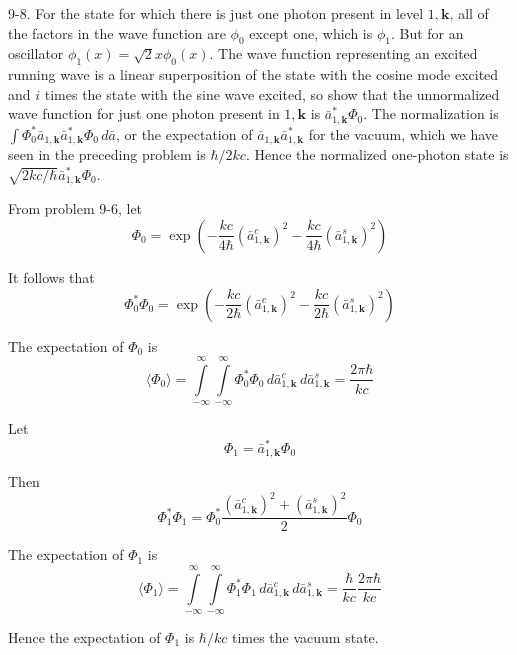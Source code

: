 \documentclass[12pt]{article}
\begin{document}
9-8.
For the state for which there is just one photon
present in level $1,\mathbf k$, all of the factors in the wave function are
$\phi_0$ except one, which is $\phi_1$.
But for an oscillator $\phi_1(x)=\sqrt2x\phi_0(x)$.
The wave function representing an excited running wave is a linear
superposition of the state with the cosine mode excited and $i$
times the state with the sine wave excited, so show that the
unnormalized wave function for just one photon present in
$1,\mathbf k$ is $\bar a_{1,\mathbf k}^*\Phi_0$.
The normalization is
$\int\Phi_0^*\bar a_{1,\mathbf k}\bar a_{1,\mathbf k}^*\Phi_0\,d\bar a$,
or the expectation of $\bar a_{1,\mathbf k}\bar a_{1,\mathbf k}^*$ for the
vacuum, which we have seen in the preceding problem is $\hbar/2kc$.
Hence the normalized one-photon state is
$\sqrt{2kc/\hbar}\bar a_{1,\mathbf k}^*\Phi_0$.

\bigskip
From problem 9-6, let
\begin{equation*}
\Phi_0=\exp\left(-\frac{kc}{4\hbar}(\bar a_{1,\mathbf k}^c)^2-\frac{kc}{4\hbar}(\bar a_{1,\mathbf k}^s)^2\right)
\end{equation*}

It follows that
\begin{equation*}
\Phi_0^*\Phi_0=\exp\left(-\frac{kc}{2\hbar}(\bar a_{1,\mathbf k}^c)^2-\frac{kc}{2\hbar}(\bar a_{1,\mathbf k}^s)^2\right)
\end{equation*}

The expectation of $\Phi_0$ is
\begin{equation*}
\langle\Phi_0\rangle=
\int\limits_{-\infty}^\infty
\int\limits_{-\infty}^\infty
\Phi_0^*\Phi_0
\,d\bar a_{1,\mathbf k}^c\,d\bar a_{1,\mathbf k}^s=\frac{2\pi\hbar}{kc}
\tag{1}
\end{equation*}

Let
\begin{equation*}
\Phi_1=\bar a_{1,\mathbf k}^*\Phi_0
\end{equation*}

Then
\begin{equation*}
\Phi_1^*\Phi_1=\Phi_0^*\frac{(\bar a_{1,\mathbf k}^c)^2+(\bar a_{1,\mathbf k}^s)^2}{2}\Phi_0
\end{equation*}

The expectation of $\Phi_1$ is
\begin{equation*}
\langle\Phi_1\rangle=
\int\limits_{-\infty}^\infty
\int\limits_{-\infty}^\infty
\Phi_1^*\Phi_1
\,d\bar a_{1,\mathbf k}^c\,d\bar a_{1,\mathbf k}^s
=\frac{\hbar}{kc}\frac{2\pi\hbar}{kc}
\tag{2}
\end{equation*}

Hence the expectation of $\Phi_1$ is $\hbar/kc$ times the vacuum state.
\end{document}
